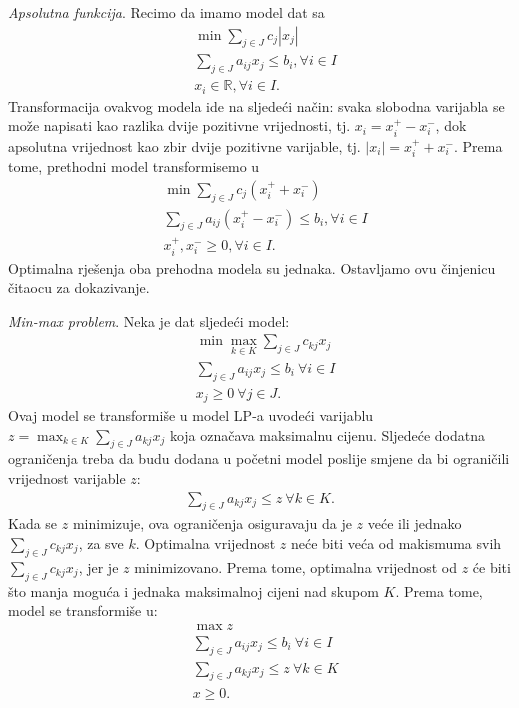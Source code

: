 \documentclass[a4paper, utf8, 11pt, colorlinks]{book}
\begin{document}
\emph{Apsolutna funkcija}.   Recimo da imamo model dat sa 
\begin{align*}
	&\min \sum_{j \in J} c_j |x_j| \\
	& \sum_{j\in J} a_{ij} x_j \leq b_i, \forall i\in I \\
	& x_i \in \mathbb{R}, \forall i \in I.
\end{align*}  
Transformacija ovakvog modela ide na sljedeći način: 
svaka slobodna varijabla se može napisati kao razlika dvije pozitivne vrijednosti, tj.  $x_i = x_i^+ - x_i^-$, dok apsolutna vrijednost kao zbir dvije pozitivne varijable, tj. $|x_i|= x_i^+ + x_i^-$. Prema tome, prethodni model transformisemo u 
\begin{align*}
	&\min \sum_{j \in J} c_j  (x_i^+ + x_i^-) \\
	&\sum_{j\in J} a_{ij} (  x_i^+ - x_i^- ) \leq b_i, \forall i\in I \\
	&  x_i^+, x_i^- \geq 0, \forall i \in I.
\end{align*}
Optimalna rješenja oba prehodna modela su jednaka. Ostavljamo ovu činjenicu čitaocu za dokazivanje.

\emph{Min-max problem}. Neka je dat sljedeći model: 
\begin{align*}
	&\min \max_{k \in K} \sum_{j \in J} c_{kj} x_j \\
	& \sum_{j \in J} a_{ij} x_j \leq b_i\  \forall i \in I \\
	& x_j \geq 0\ \forall j \in J.
\end{align*}
Ovaj  model se transformiše u model LP-a uvodeći varijablu $z=\max_{k \in K} \sum_{j \in J} a_{kj}x_j$ koja označava maksimalnu cijenu. Sljedeće dodatna ograničenja treba da budu dodana u početni model poslije smjene da bi ograničili vrijednost varijable $z$:
\begin{eqnarray}
	\sum_{j \in J} a_{kj} x_j \leq z\ \forall k \in K.
\end{eqnarray}
Kada se $z$ minimizuje, ova ograničenja osiguravaju da je $z$ veće ili jednako  $\sum_{j \in J} c_{kj}x_j$, za sve $k$. Optimalna vrijednost $z$ neće biti veća od makismuma svih $\sum_{j \in J} c_{kj}x_j$, jer je $z$ minimizovano. Prema tome, optimalna vrijednost od $z$ će biti što manja moguća i jednaka maksimalnoj cijeni nad skupom $K$. Prema tome, model se transformiše u:
\begin{align*}
	&\max z \\
	&\sum_{j \in J} a_{ij} x_j \leq b_i\  \forall i \in I \\ 
	& 	 \sum_{j \in J} a_{kj} x_j \leq z\ \forall k \in K \\
	& x \geq 0.
\end{align*}
\end{document}
